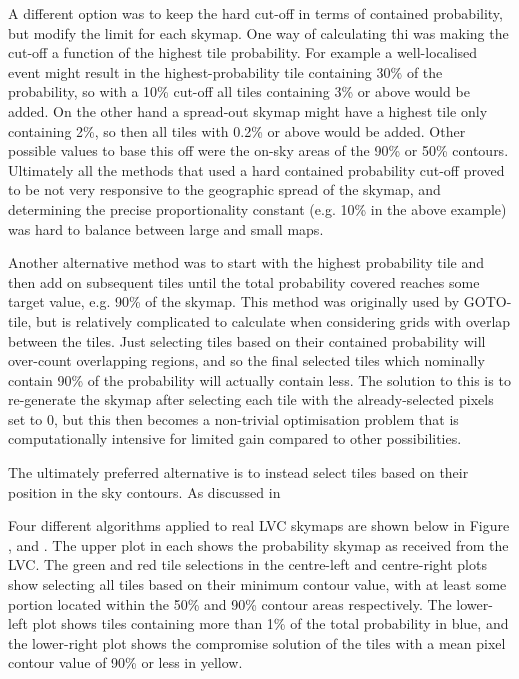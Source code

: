 \begin{colsection}
\begin{colsection}
A different option was to keep the hard cut-off in terms of contained probability, but modify the limit for each skymap. One way of calculating thi was making the cut-off a function of the highest tile probability. For example a well-localised event might result in the highest-probability tile containing $30\%$ of the probability, so with a 10\% cut-off all tiles containing 3\% or above would be added. On the other hand a spread-out skymap might have a highest tile only containing 2\%, so then all tiles with 0.2\% or above would be added. Other possible values to base this off were the on-sky areas of the 90\% or 50\% contours. Ultimately all the methods that used a hard contained probability cut-off proved to be not very responsive to the geographic spread of the skymap, and determining the precise proportionality constant (e.g. 10\% in the above example) was hard to balance between large and small maps.

Another alternative method was to start with the highest probability tile and then add on subsequent tiles until the total probability covered reaches some target value, e.g. 90\% of the skymap. This method was originally used by GOTO-tile, but is relatively complicated to calculate when considering grids with overlap between the tiles. Just selecting tiles based on their contained probability will over-count overlapping regions, and so the final selected tiles which nominally contain 90\% of the probability will actually contain less. The solution to this is to re-generate the skymap after selecting each tile with the already-selected pixels set to 0, but this then becomes a non-trivial optimisation problem that is computationally intensive for limited gain compared to other possibilities.

The ultimately preferred alternative is to instead select tiles based on their position in the sky contours. As discussed in  



Four different algorithms applied to real LVC skymaps are shown below in Figure ,  and . The upper plot in each shows the probability skymap as received from the LVC. The green and red tile selections in the centre-left and centre-right plots show selecting all tiles based on their minimum contour value, with at least some portion located within the 50\% and 90\% contour areas respectively. The lower-left plot shows tiles containing more than 1\% of the total probability in blue, and the lower-right plot shows the compromise solution of the tiles with a mean pixel contour value of 90\% or less in yellow.


\end{colsection}
\end{colsection}
